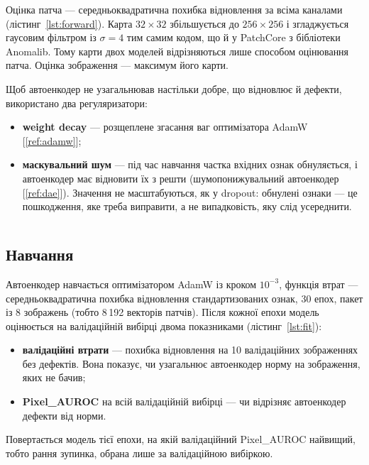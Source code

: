 \documentclass[14pt,a4paper]{extreport}
\begin{document}
Оцінка патча --- середньоквадратична похибка відновлення за всіма каналами (лістинг~\ref{lst:forward}). Карта $32 \times 32$ збільшується до $256 \times 256$ і згладжується гаусовим фільтром із $\sigma = 4$ тим самим кодом, що й у PatchCore з бібліотеки Anomalib. Тому карти двох моделей відрізняються лише способом оцінювання патча. Оцінка зображення --- максимум його карти.

Щоб автоенкодер не узагальнював настільки добре, що відновлює й дефекти, використано два регуляризатори:

\begin{itemize}
\item \textbf{weight decay} --- розщеплене згасання ваг оптимізатора AdamW [\ref{ref:adamw}];
\item \textbf{маскувальний шум} --- під час навчання частка вхідних ознак обнуляється, і автоенкодер має відновити їх з решти (шумопонижувальний автоенкодер [\ref{ref:dae}]). Значення не масштабуються, як у dropout: обнулені ознаки --- це пошкодження, яке треба виправити, а не випадковість, яку слід усереднити.
\end{itemize}

\inputminted[firstline=110,lastline=138]{python}{../src/mk1/feature_ae.py}
\label{lst:forward}

\subsection{Навчання}

Автоенкодер навчається оптимізатором AdamW із кроком $10^{-3}$, функція втрат --- середньоквадратична похибка відновлення стандартизованих ознак, 30 епох, пакет із 8 зображень (тобто 8\,192 векторів патчів). Після кожної епохи модель оцінюється на валідаційній вибірці двома показниками (лістинг~\ref{lst:fit}):

\begin{itemize}
\item \textbf{валідаційні втрати} --- похибка відновлення на 10 валідаційних зображеннях без дефектів. Вона показує, чи узагальнює автоенкодер норму на зображення, яких не бачив;
\item \textbf{Pixel\_AUROC} на всій валідаційній вибірці --- чи відрізняє автоенкодер дефекти від норми.
\end{itemize}

Повертається модель тієї епохи, на якій валідаційний Pixel\_AUROC найвищий, тобто рання зупинка, обрана лише за валідаційною вибіркою.
\end{document}
